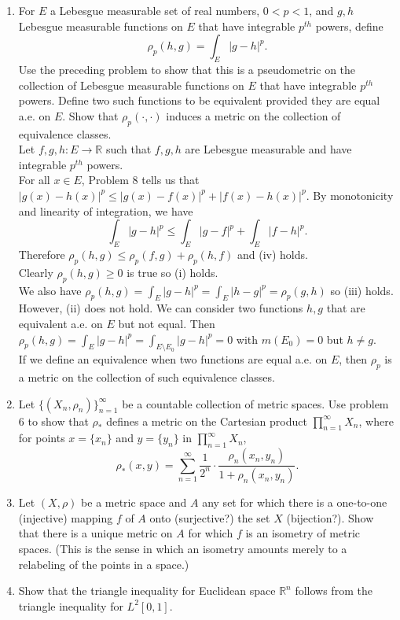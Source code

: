 \begin{enumerate}
    \item For $E$ a Lebesgue measurable set of real numbers, $0<p<1$, and $g,h$ Lebesgue measurable functions on $E$ that have integrable $p^{th}$ powers, define
    \[
    \rho_p(h,g)=\int_E|g-h|^p.    
    \]  
    Use the preceding problem to show that this is a pseudometric on the collection of Lebesgue measurable functions on $E$ that have integrable $p^{th}$ powers.
    Define two such functions to be equivalent provided they are equal a.e. on $E$. 
    Show that $\rho_p(\cdot,\cdot)$ induces a metric on the collection of equivalence classes.
    \\Let $f,g,h:E\to\mathbb{R}$ such that $f,g,h$ are Lebesgue measurable and have integrable $p^{th}$ powers. 
    \\For all $x\in E$, Problem 8 tells us that $|g(x)-h(x)|^p\le|g(x)-f(x)|^p+|f(x)-h(x)|^p$.
    By monotonicity and linearity of integration, we have
    \[
        \int_E|g-h|^p\le\int_E|g-f|^p+\int_E|f-h|^p.
    \]
    Therefore $\rho_p(h,g)\le\rho_p(f,g)+\rho_p(h,f)$ and (iv) holds.\\
    Clearly $\rho_p(h,g)\ge0$ is true so (i) holds.\\
    We also have $\rho_p(h,g)=\int_E|g-h|^p=\int_E|h-g|^p=\rho_p(g,h)$ so (iii) holds.\\
    However, (ii) does not hold. We can consider two functions $h,g$ that are equivalent a.e. on $E$ but not equal.
    Then $ \rho_p(h,g)=\int_E|g-h|^p= \int_{E\setminus E_0}|g-h|^p=0$ with $m(E_0)=0$ but $h\neq g$.\\
    If we define an equivalence when two functions are equal a.e. on $E$, then $\rho_p$ is a metric on the collection of such equivalence classes. 
    \item Let $\{(X_n,\rho_n)\}_{n=1}^\infty$ be a countable collection of metric spaces.
    Use problem 6 to show that $\rho_*$ defines a metric on the Cartesian product $\prod_{n=1}^\infty X_n$, where for points $x = \{x_n\}$ and $y= \{y_n\}$ in $\prod_{n=1}^\infty X_n$,
    \[
    \rho_*(x,y)=\sum_{n=1}^\infty\frac{1}{2^n}\cdot\frac{\rho_n(x_n,y_n)}{1+\rho_n(x_n,y_n)}.    
    \]
    \item Let $(X,\rho)$ be a metric space and $A$ any set for which there is a one-to-one (injective) mapping $f$ of $A$ onto (surjective?) the set $X$ (bijection?).
    Show that there is a unique metric on $A$ for which $f$ is an isometry of metric spaces.
    (This is the sense in which an isometry amounts merely to a relabeling of the points in a space.)
    \item Show that the triangle inequality for Euclidean space $\mathbb{R}^n$ follows from the triangle inequality for $L^2[0,1]$.
    

\end{enumerate}

